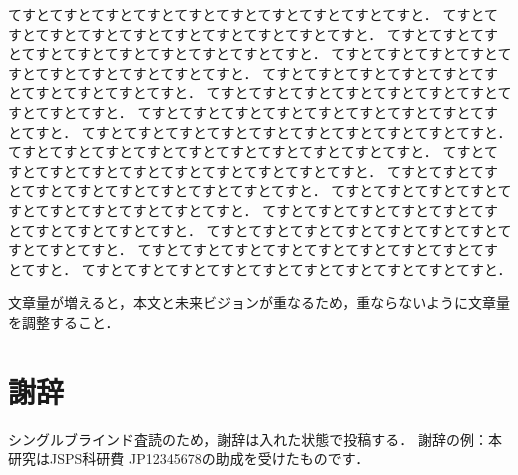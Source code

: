 \documentclass[twoside]{wiss}
\begin{document}
てすとてすとてすとてすとてすとてすとてすとてすとてすとてすと．
てすとてすとてすとてすとてすとてすとてすとてすとてすとてすと．
てすとてすとてすとてすとてすとてすとてすとてすとてすとてすと．
てすとてすとてすとてすとてすとてすとてすとてすとてすとてすと．
てすとてすとてすとてすとてすとてすとてすとてすとてすとてすと．
てすとてすとてすとてすとてすとてすとてすとてすとてすとてすと．
てすとてすとてすとてすとてすとてすとてすとてすとてすとてすと．
てすとてすとてすとてすとてすとてすとてすとてすとてすとてすと．
てすとてすとてすとてすとてすとてすとてすとてすとてすとてすと．
てすとてすとてすとてすとてすとてすとてすとてすとてすとてすと．
てすとてすとてすとてすとてすとてすとてすとてすとてすとてすと．
てすとてすとてすとてすとてすとてすとてすとてすとてすとてすと．
てすとてすとてすとてすとてすとてすとてすとてすとてすとてすと．
てすとてすとてすとてすとてすとてすとてすとてすとてすとてすと．
てすとてすとてすとてすとてすとてすとてすとてすとてすとてすと．
てすとてすとてすとてすとてすとてすとてすとてすとてすとてすと．


文章量が増えると，本文と未来ビジョンが重なるため，重ならないように文章量を調整すること．


\section*{謝辞}
シングルブラインド査読のため，謝辞は入れた状態で投稿する．
謝辞の例：本研究はJSPS科研費 JP12345678の助成を受けたものです．














\end{document}
